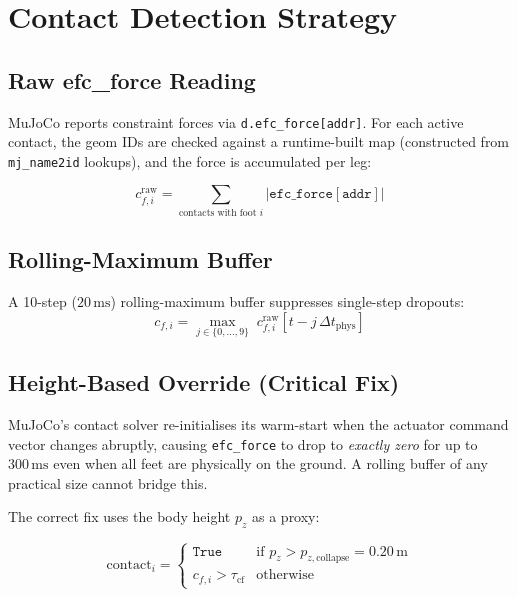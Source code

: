 \documentclass[12pt,a4paper]{report}
\begin{document}
\section{Contact Detection Strategy}

\subsection{Raw efc\_force Reading}

MuJoCo reports constraint forces via \texttt{d.efc\_force[addr]}.  For each
active contact, the geom IDs are checked against a runtime-built map
(constructed from \texttt{mj\_name2id} lookups), and the force is accumulated
per leg:

\begin{equation}
    c_{f,i}^{\text{raw}} = \sum_{\text{contacts with foot }i}
    \left|\texttt{efc\_force}[\texttt{addr}]\right|
\end{equation}

\subsection{Rolling-Maximum Buffer}

A 10-step ($20\,\text{ms}$) rolling-maximum buffer suppresses single-step
dropouts:
\begin{equation}
    c_{f,i} = \max_{j \in \{0,\ldots,9\}}\; c_{f,i}^{\text{raw}}[t - j\,\Delta t_\text{phys}]
\end{equation}

\subsection{Height-Based Override (Critical Fix)}

MuJoCo's contact solver re-initialises its warm-start when the actuator
command vector changes abruptly, causing \texttt{efc\_force} to drop to
\emph{exactly zero} for up to $300\,\text{ms}$ even when all feet are
physically on the ground.  A rolling buffer of any practical size cannot
bridge this.

The correct fix uses the body height $p_z$ as a proxy:

\begin{equation}
    \text{contact}_i =
    \begin{cases}
        \texttt{True}  & \text{if } p_z > p_{z,\text{collapse}} = 0.20\,\text{m} \\
        c_{f,i} > \tau_\text{cf} & \text{otherwise}
    \end{cases}
    \label{eq:contact_override}
\end{equation}
\end{document}
